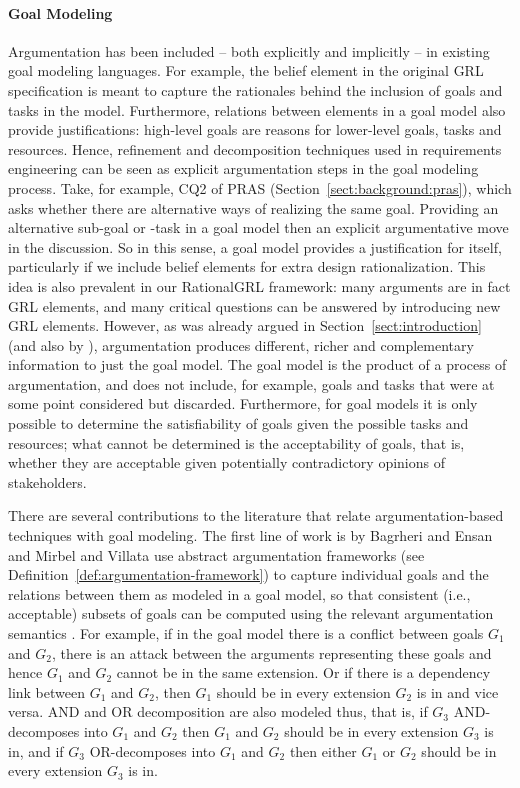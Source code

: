 \paragraph{Goal Modeling} Argumentation has been included -- both explicitly and implicitly -- in existing goal modeling languages. For example, the belief element in the original GRL specification \cite{Amyot:2010:EGM:1841349.1841356} is meant to capture the rationales behind the inclusion of goals and tasks in the model. Furthermore, relations between elements in a goal model also provide justifications: high-level goals are reasons for lower-level goals, tasks and resources. Hence, refinement and decomposition techniques used in requirements engineering \cite{van2001goal} can be seen as explicit argumentation steps in the goal modeling process. Take, for example, CQ2 of PRAS (Section~\ref{sect:background:pras}), which asks whether there are alternative ways of realizing the same goal. Providing an alternative sub-goal or -task in a goal model then an explicit argumentative move in the discussion. So in this sense, a goal model provides a justification for itself, particularly if we include belief elements for extra design rationalization. This idea is also prevalent in our RationalGRL framework: many arguments are in fact GRL elements, and many critical questions can be answered by introducing new GRL elements. However, as was already argued in Section~\ref{sect:introduction} (and also by \cite{Jureta:RE2008}), argumentation produces different, richer and complementary information to just the goal model. The goal model is the product of a process of argumentation, and does not include, for example, goals and tasks that were at some point considered but discarded. Furthermore, for goal models it is only possible to determine the satisfiability of goals given the possible tasks and resources; what cannot be determined is the acceptability of goals, that is, whether they are acceptable given potentially contradictory opinions of stakeholders.  

There are several contributions to the literature that relate argumentation-based techniques with goal modeling. The first line of work is by Bagrheri and Ensan \cite{bagheri2011consolidating} and Mirbel and Villata \cite{MirbelVillata12} use abstract argumentation frameworks (see Definition~\ref{def:argumentation-framework}) to capture individual goals and the relations between them as modeled in a goal model, so that consistent (i.e., acceptable) subsets of goals can be computed using the relevant argumentation semantics \cite{Dung1995}. For example, if in the goal model there is a conflict between goals $G_1$ and $G_2$, there is an attack between the arguments representing these goals and hence $G_1$ and $G_2$ cannot be in the same extension. Or if there is a dependency link between $G_1$ and $G_2$, then $G_1$ should be in every extension $G_2$ is in and vice versa. AND and OR decomposition are also modeled thus, that is, if $G_3$ AND-decomposes into $G_1$ and $G_2$ then $G_1$ and $G_2$ should be in every extension $G_3$ is in, and if $G_3$ OR-decomposes into $G_1$ and $G_2$ then either $G_1$ or $G_2$ should be in every extension $G_3$ is in. 

